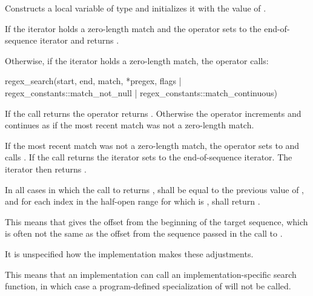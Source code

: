 \begin{itemdescr}
\pnum
\effects
Constructs a local variable  of type  and
initializes it with the value of .

\pnum
If the iterator holds a zero-length match and  the operator
sets  to the end-of-sequence iterator and returns .

\pnum
{}%
%
Otherwise, if the iterator holds a zero-length match, the operator calls:
\begin{codeblock}
regex_search(start, end, match, *pregex,
             flags | regex_constants::match_not_null | regex_constants::match_continuous)
\end{codeblock}
If the call returns  the operator
returns . Otherwise the operator increments  and continues as if
the most recent match was not a zero-length match.

\pnum
{}%
If the most recent match was not a zero-length match, the operator sets
 to  and
calls . If the call returns
 the iterator sets  to the end-of-sequence iterator. The
iterator then returns .

\pnum
In all cases in which the call to  returns ,
 shall be equal to the previous value of
, and for each index  in the half-open range
\tcode{[0, match.size())} for which  is ,
shall return .

\pnum
\begin{note}
This means that  gives the
offset from the beginning of the target sequence, which is often not
the same as the offset from the sequence passed in the call
to .
\end{note}

\pnum
It is unspecified how the implementation makes these adjustments.

\pnum
\begin{note}
This means that an implementation can call an
implementation-specific search function, in which case a program-defined
specialization of  will not be
called.
\end{note}
\end{itemdescr}


